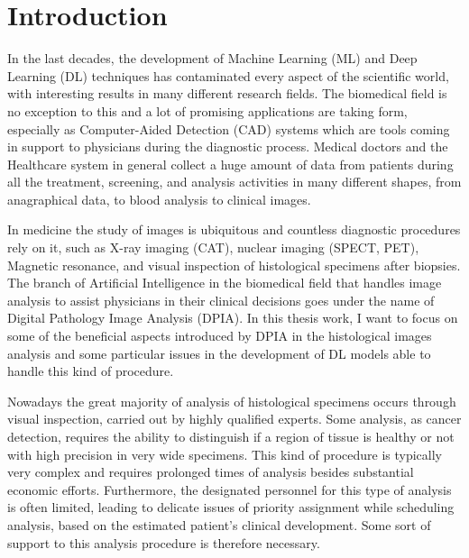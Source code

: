\chapter*{Introduction}
In the last decades, the development of Machine Learning (ML) and Deep Learning (DL) techniques has contaminated every aspect of the scientific world, with interesting results in many different research fields. The biomedical field is no exception to this and a lot of promising applications are taking form, especially as Computer-Aided Detection (CAD) systems which are tools coming in support to physicians during the diagnostic process. Medical doctors and the Healthcare system in general collect a huge amount of data from patients during all the treatment, screening, and analysis activities in many different shapes, from anagraphical data, to blood analysis to clinical images.


In medicine the study of images is ubiquitous and countless diagnostic procedures rely on it, such as X-ray imaging (CAT), nuclear imaging (SPECT, PET), Magnetic resonance, and visual inspection of histological specimens after biopsies. The branch of Artificial Intelligence in the biomedical field that handles image analysis to assist physicians in their clinical decisions goes under the name of Digital Pathology Image Analysis (DPIA).
In this thesis work, I want to focus on some of the beneficial aspects introduced by DPIA in the histological images analysis and some particular issues in the development of DL models able to handle this kind of procedure.


Nowadays the great majority of analysis of histological specimens occurs through visual inspection, carried out by highly qualified experts. Some analysis, as cancer detection, requires the ability to distinguish if a region of tissue is healthy or not with high precision in very wide specimens. This kind of procedure is typically very complex and requires prolonged times of analysis besides substantial economic efforts. Furthermore, the designated personnel for this type of analysis is often limited, leading to delicate issues of priority assignment while scheduling analysis, based on the estimated patient's clinical development. Some sort of support to this analysis procedure is therefore necessary.


